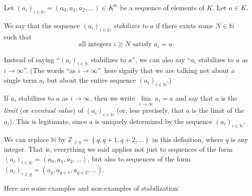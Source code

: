 \begin{definition}
\label{def.fps.lim.stab}Let $\left(  a_{i}\right)  _{i\in\mathbb{N}}=\left(
a_{0},a_{1},a_{2},\ldots\right)  \in K^{\mathbb{N}}$ be a sequence of elements
of $K$. Let $a\in K$.

We say that the sequence $\left(  a_{i}\right)  _{i\in\mathbb{N}}$
\emph{stabilizes to }$a$ if there exists some $N\in\mathbb{N}$ such that%
\[
\text{all integers }i\geq N\text{ satisfy }a_{i}=a.
\]


Instead of saying \textquotedblleft$\left(  a_{i}\right)  _{i\in\mathbb{N}}$
stabilizes to $a$\textquotedblright, we can also say \textquotedblleft$a_{i}$
stabilizes to $a$ as $i\rightarrow\infty$\textquotedblright. (The words
\textquotedblleft as $i\rightarrow\infty$\textquotedblright\ here signify that
we are talking not about a single term $a_{i}$ but about the entire sequence
$\left(  a_{i}\right)  _{i\in\mathbb{N}}$.)

If $a_{i}$ stabilizes to $a$ as $i\rightarrow\infty$, then we write
$\lim\limits_{i\rightarrow\infty}a_{i}=a$ and say that $a$ is the \emph{limit}
(or \emph{eventual value}) of $\left(  a_{i}\right)  _{i\in\mathbb{N}}$ (or,
less precisely, that $a$ is the limit of the $a_{i}$). This is legitimate,
since $a$ is uniquely determined by the sequence $\left(  a_{i}\right)
_{i\in\mathbb{N}}$.

We can replace $\mathbb{N}$ by $\mathbb{Z}_{\geq q}=\left\{  q,q+1,q+2,\ldots
\right\}  $ in this definition, where $q$ is any integer. That is, everything
we said applies not just to sequences of the form $\left(  a_{i}\right)
_{i\in\mathbb{N}}=\left(  a_{0},a_{1},a_{2},\ldots\right)  $, but also to
sequences of the form $\left(  a_{i}\right)  _{i\geq q}=\left(  a_{q}%
,a_{q+1},a_{q+2},\ldots\right)  $.
\end{definition}

Here are some examples and non-examples of stabilization:

